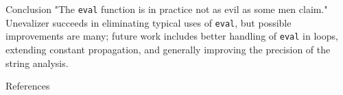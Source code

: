 \documentclass{beamer}
\begin{document}
\begin{frame}{Conclusion}
"The {\tt eval} function is in practice not as evil as some men claim."
\vspace{5mm}
Unevalizer succeeds in eliminating typical uses of {\tt eval}, but
possible improvements are many; future work includes better handling of
{\tt eval} in loops, extending constant propagation, and generally improving
the precision of the string analysis.
\end{frame}

\begin{frame}{References}

{\footnotesize
}
\end{frame}
\end{document}
